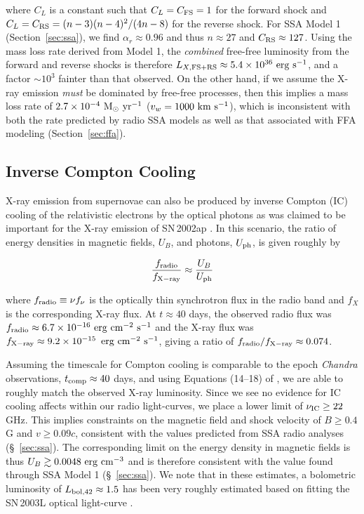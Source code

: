 \documentclass[12pt,preprint]{aastex}
\begin{document}
\noindent
where $C_L$ is a constant such that $C_L=C_{\rm FS}=1$ for the forward
shock and $C_L=C_{\rm RS}=(n-3)(n-4)^2/(4n-8)$ for the reverse shock.
For SSA Model 1 (Section~\ref{sec:ssa}), we find $\alpha_r\approx
0.96$ and thus $n\approx 27$ and $C_{\rm RS}\approx 127$.  Using the
mass loss rate derived from Model 1, the {\it combined} free-free
luminosity from the forward and reverse shocks is therefore $L_{X,\rm
FS+RS}\approx 5.4\times 10^{36}~\rm erg~s^{-1}$, and a factor $\sim
10^3$ fainter than that observed.  On the other hand, if we assume the
X-ray emission {\it must} be dominated by free-free processes, then
this implies a mass loss rate of $2.7\times 10^{-4}~\rm M_{\odot}~
yr^{-1}$ ($v_w=1000~\rm km~s^{-1}$), which is inconsistent with both
the rate predicted by radio SSA models as well as that associated with
FFA modeling (Section~\ref{sec:ffa}).

\subsection{Inverse Compton Cooling}
X-ray emission from supernovae can also be produced by inverse Compton
(IC) cooling of the relativistic electrons by the optical photons as
was claimed to be important for the X-ray emission of SN\,2002ap
\citep{bf04}.  In this scenario, the ratio of energy densities in
magnetic fields, $U_B$, and photons, $U_{\rm ph}$, is given roughly by

\begin{equation}
\frac{f_{\rm radio}}{f_{\rm X-ray}}\approx \frac{U_B}{U_{\rm ph}}
\end{equation} 

\noindent
where $f_{\rm radio}\equiv \nu f_{\nu}$ is the optically thin
synchrotron flux in the radio band and $f_{X}$ is the corresponding
X-ray flux.  At $t\approx 40$ days, the observed radio flux was
$f_{\rm radio}\approx 6.7\times 10^{-16}~\rm erg~cm^{-2}~s^{-1}$ and
the X-ray flux was $f_{\rm X-ray}\approx 9.2\times
10^{-15}\,\rm~erg~cm^{-2}~s^{-1}$, giving a ratio of 
$f_{\rm radio}/f_{\rm X-ray}\approx 0.074$.

Assuming the timescale for Compton cooling is comparable to the epoch
{\it Chandra} observations, $t_{\rm comp} \approx 40$ days, and using
Equations (14--18) of \citet{bf04}, we are able to roughly match the
observed X-ray luminosity.  Since we see no evidence for IC cooling
affects within our radio light-curves, we place a lower limit of
$\nu_{\rm IC} \ge 22$ GHz.  This implies constraints on the magnetic
field and shock velocity of $B\ge 0.4$ G and $v\ge 0.09c$, consistent
with the values predicted from SSA radio analyses
(\S~\ref{sec:ssa}). The corresponding limit on the energy density in
magnetic fields is thus $U_B\gtrsim 0.0048~\rm erg~cm^{-3}$ and is
therefore consistent with the value found through SSA Model 1
(\S~\ref{sec:ssa}). We note that in these estimates, a bolometric
luminosity of $L_{\rm bol, 42}\approx 1.5$ has been very roughly
estimated based on fitting the SN\,2003L optical light-curve
\citep{skg+04}.
\end{document}

